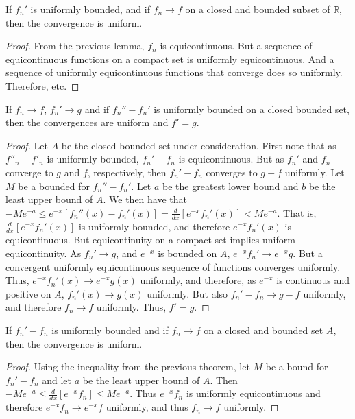 \documentclass[crop=false,class=book,oneside]{standalone}
\begin{document}
            \begin{theorem}
                If $f_n'$ is uniformly bounded, and if $f_n \rightarrow f$ on a closed and bounded subset of $\mathbb{R}$, then the convergence is uniform.
            \end{theorem}
            \begin{proof}
                From the previous lemma, $f_n$ is equicontinuous. But a sequence of equicontinuous functions on a compact set is uniformly equicontinuous. And a sequence of uniformly equicontinuous functions that converge does so uniformly. Therefore, etc.
            \end{proof}
            \begin{theorem}
                If $f_n \rightarrow f$, $f_n'\rightarrow g$ and if $f_n''-f_n'$ is uniformly bounded on a closed bounded set, then the convergences are uniform and $f' = g$.
            \end{theorem}
            \begin{proof}
                Let $A$ be the closed bounded set under consideration. First note that as $f''_n - f'_n$ is uniformly bounded, $f_n'-f_n$ is equicontinuous. But as $f_n'$ and $f_n$ converge to $g$ and $f$, respectively, then $f_n'-f_n$ converges to $g-f$ uniformly. Let $M$ be a bounded for $f_n''-f_n'$. Let $a$ be the greatest lower bound and $b$ be the least upper bound of $A$. We then have that $-Me^{-a}\leq e^{-x}[f_n''(x)-f_n'(x)]=\frac{d}{dx}[e^{-x}f_n'(x)] < Me^{-a}$. That is, $\frac{d}{dx}[e^{-x}f_n'(x)]$ is uniformly bounded, and therefore $e^{-x}f_n'(x)$ is equicontinuous. But equicontinuity on a compact set implies uniform equicontinuity. As $f_n'\rightarrow g$, and $e^{-x}$ is bounded on $A$, $e^{-x}f_n'\rightarrow e^{-x}g$. But a convergent uniformly equicontinuous sequence of functions converges uniformly. Thus, $e^{-x}f_n'(x) \rightarrow e^{-x}g(x)$ uniformly, and therefore, as $e^{-x}$ is continuous and positive on $A$, $f_n'(x)\rightarrow g(x)$ uniformly. But also $f_n'-f_n \rightarrow g-f$ uniformly, and therefore $f_n \rightarrow f$ uniformly. Thus, $f'=g$.
            \end{proof}
            \begin{corollary}
                If $f_n' - f_n$ is uniformly bounded and if $f_n \rightarrow f$ on a closed and bounded set $A$, then the convergence is uniform.
            \end{corollary}
            \begin{proof}
                Using the inequality from the previous theorem, let $M$ be a bound for $f_n'-f_n$ and let $a$ be the least upper bound of $A$. Then $-Me^{-a}\leq \frac{d}{dx}[e^{-x}f_n] \leq Me^{-a}$. Thus $e^{-x}f_n$ is uniformly equicontinuous and therefore $e^{-x}f_n\rightarrow e^{-x}f$ uniformly, and thus $f_n\rightarrow f$ uniformly.
            \end{proof}
\end{document}
